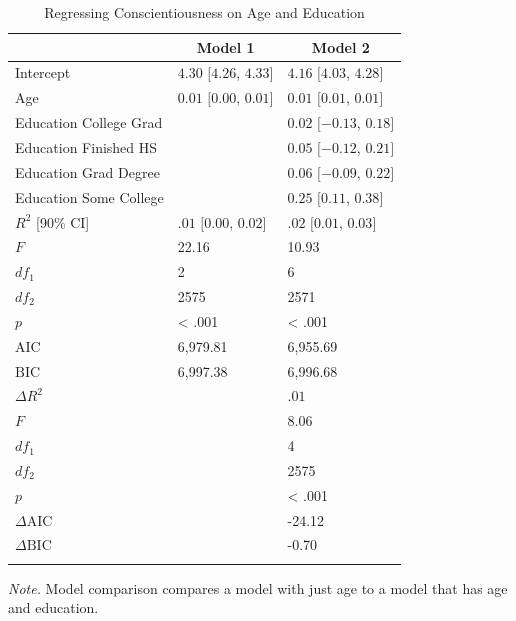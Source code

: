 \documentclass[
  man,floatsintext]{apa6}
\begin{document}
\begin{table}[tbp]
\begin{center}
\begin{threeparttable}
\caption{\label{tab:reg-models-tbl}Regressing Conscientiousness on Age and Education}
\begin{tabular}{lll}
\toprule
 & \multicolumn{1}{c}{Model 1} & \multicolumn{1}{c}{Model 2}\\
\midrule
Intercept & $4.30$ $[4.26$, $4.33]$ & $4.16$ $[4.03$, $4.28]$\\
Age & $0.01$ $[0.00$, $0.01]$ & $0.01$ $[0.01$, $0.01]$\\
Education College Grad &  & $0.02$ $[-0.13$, $0.18]$\\
Education Finished HS &  & $0.05$ $[-0.12$, $0.21]$\\
Education Grad Degree &  & $0.06$ $[-0.09$, $0.22]$\\
Education Some College &  & $0.25$ $[0.11$, $0.38]$\\
$R^2$ [90\% CI] & $.01$ $[0.00$, $0.02]$ & $.02$ $[0.01$, $0.03]$\\
$F$ & 22.16 & 10.93\\
$df_1$ & 2 & 6\\
$df_2$ & 2575 & 2571\\
$p$ & < .001 & < .001\\
$\mathrm{AIC}$ & 6,979.81 & 6,955.69\\
$\mathrm{BIC}$ & 6,997.38 & 6,996.68\\
$\Delta R^2$ &  & $.01$\\
$F$ &  & 8.06\\
$df_1$ &  & 4\\
$df_2$ &  & 2575\\
$p$ &  & < .001\\
$\Delta \mathrm{AIC}$ &  & -24.12\\
$\Delta \mathrm{BIC}$ &  & -0.70\\
\bottomrule
\addlinespace
\end{tabular}
\begin{tablenotes}[para]
\normalsize{\textit{Note.} Model comparison compares a model with just age to a model that has age and education.}
\end{tablenotes}
\end{threeparttable}
\end{center}
\end{table}
\end{document}
